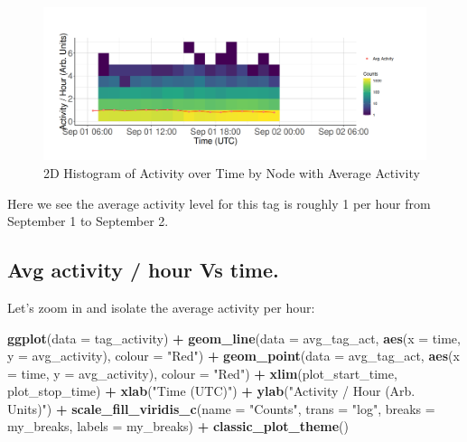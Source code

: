 \documentclass[
]{book}
\newenvironment{Shaded}{\begin{snugshade}}{\end{snugshade}}
\newcommand{\AttributeTok}[1]{\textcolor[rgb]{0.13,0.29,0.53}{#1}}
\newcommand{\FunctionTok}[1]{\textcolor[rgb]{0.13,0.29,0.53}{\textbf{#1}}}
\newcommand{\NormalTok}[1]{#1}
\newcommand{\SpecialCharTok}[1]{\textcolor[rgb]{0.81,0.36,0.00}{\textbf{#1}}}
\newcommand{\StringTok}[1]{\textcolor[rgb]{0.31,0.60,0.02}{#1}}
\begin{document}
\begin{figure}
\centering
\includegraphics{images/activity_level_average_activity_vs_time.png}
\caption{2D Histogram of Activity over Time by Node with Average Activity}
\end{figure}

Here we see the average activity level for this tag is roughly 1 per hour from September 1 to September 2.

\subsection{Avg activity / hour Vs time.}\label{avg-activity-hour-vs-time.}

Let's zoom in and isolate the average activity per hour:

\begin{Shaded}
\begin{Highlighting}[]
\FunctionTok{ggplot}\NormalTok{(}\AttributeTok{data =}\NormalTok{ tag\_activity) }\SpecialCharTok{+}
  \FunctionTok{geom\_line}\NormalTok{(}\AttributeTok{data =}\NormalTok{ avg\_tag\_act, }
            \FunctionTok{aes}\NormalTok{(}\AttributeTok{x =}\NormalTok{ time, }
                \AttributeTok{y =}\NormalTok{ avg\_activity),}
            \AttributeTok{colour =} \StringTok{"Red"}\NormalTok{) }\SpecialCharTok{+}
  \FunctionTok{geom\_point}\NormalTok{(}\AttributeTok{data =}\NormalTok{ avg\_tag\_act, }
             \FunctionTok{aes}\NormalTok{(}\AttributeTok{x =}\NormalTok{ time, }
                 \AttributeTok{y =}\NormalTok{ avg\_activity), }
             \AttributeTok{colour =} \StringTok{"Red"}\NormalTok{) }\SpecialCharTok{+}
  \FunctionTok{xlim}\NormalTok{(plot\_start\_time, plot\_stop\_time) }\SpecialCharTok{+}
  \FunctionTok{xlab}\NormalTok{(}\StringTok{"Time (UTC)"}\NormalTok{) }\SpecialCharTok{+}
  \FunctionTok{ylab}\NormalTok{(}\StringTok{"Activity / Hour (Arb. Units)"}\NormalTok{) }\SpecialCharTok{+}
  \FunctionTok{scale\_fill\_viridis\_c}\NormalTok{(}\AttributeTok{name =} \StringTok{"Counts"}\NormalTok{, }
                       \AttributeTok{trans =} \StringTok{"log"}\NormalTok{, }
                       \AttributeTok{breaks =}\NormalTok{ my\_breaks, }
                       \AttributeTok{labels =}\NormalTok{ my\_breaks) }\SpecialCharTok{+}
  \FunctionTok{classic\_plot\_theme}\NormalTok{()}
\end{Highlighting}
\end{Shaded}
\end{document}
